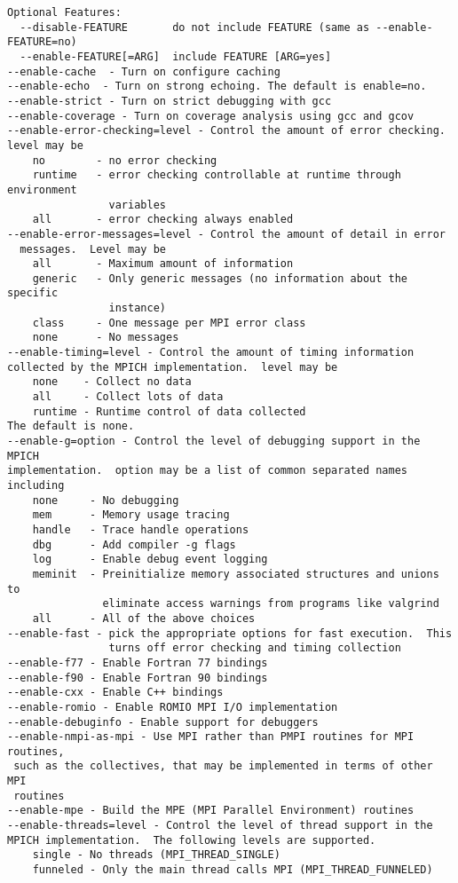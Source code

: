 \documentclass[dvipdfm,11pt]{article}
\begin{document}
\begin{small}
\begin{verbatim}
Optional Features:
  --disable-FEATURE       do not include FEATURE (same as --enable-FEATURE=no)
  --enable-FEATURE[=ARG]  include FEATURE [ARG=yes]
--enable-cache  - Turn on configure caching
--enable-echo  - Turn on strong echoing. The default is enable=no.
--enable-strict - Turn on strict debugging with gcc
--enable-coverage - Turn on coverage analysis using gcc and gcov
--enable-error-checking=level - Control the amount of error checking.
level may be
    no        - no error checking
    runtime   - error checking controllable at runtime through environment
                variables
    all       - error checking always enabled
--enable-error-messages=level - Control the amount of detail in error
  messages.  Level may be
    all       - Maximum amount of information
    generic   - Only generic messages (no information about the specific
                instance)
    class     - One message per MPI error class
    none      - No messages
--enable-timing=level - Control the amount of timing information
collected by the MPICH implementation.  level may be
    none    - Collect no data
    all     - Collect lots of data
    runtime - Runtime control of data collected
The default is none.
--enable-g=option - Control the level of debugging support in the MPICH
implementation.  option may be a list of common separated names including
    none     - No debugging
    mem      - Memory usage tracing
    handle   - Trace handle operations
    dbg      - Add compiler -g flags
    log      - Enable debug event logging
    meminit  - Preinitialize memory associated structures and unions to
               eliminate access warnings from programs like valgrind
    all      - All of the above choices
--enable-fast - pick the appropriate options for fast execution.  This
                turns off error checking and timing collection
--enable-f77 - Enable Fortran 77 bindings
--enable-f90 - Enable Fortran 90 bindings
--enable-cxx - Enable C++ bindings
--enable-romio - Enable ROMIO MPI I/O implementation
--enable-debuginfo - Enable support for debuggers
--enable-nmpi-as-mpi - Use MPI rather than PMPI routines for MPI routines,
 such as the collectives, that may be implemented in terms of other MPI
 routines
--enable-mpe - Build the MPE (MPI Parallel Environment) routines
--enable-threads=level - Control the level of thread support in the
MPICH implementation.  The following levels are supported.
    single - No threads (MPI_THREAD_SINGLE)
    funneled - Only the main thread calls MPI (MPI_THREAD_FUNNELED)

\end{verbatim}
\end{small}
\end{document}
